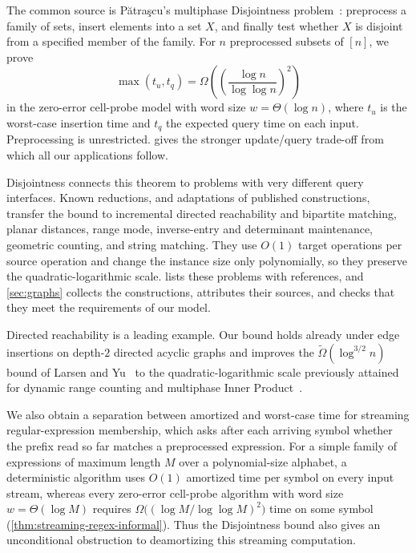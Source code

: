 \documentclass[11pt]{article}
\theoremstyle{plain}
\theoremstyle{definition}
\theoremstyle{remark}
\newcommand{\Patrascu}{P\u{a}tra\c{s}cu\xspace}
\begin{document}
The common source is \Patrascu's multiphase Disjointness problem~\cite{patrascu_mihai_towards_2010}: preprocess a family of sets, insert elements into a set $X$, and finally test whether $X$ is disjoint from a specified member of the family. For $n$ preprocessed subsets of $[n]$, we prove
\[
\max(t_u,t_q)=\Omega\!\left(\left(\frac{\log n}{\log\log n}\right)^2\right)
\]
in the zero-error cell-probe model with word size $w=\Theta(\log n)$, where $t_u$ is the worst-case insertion time and $t_q$ the expected query time on each input. Preprocessing is unrestricted.  gives the stronger update/query trade-off from which all our applications follow.

Disjointness connects this theorem to problems with very different query interfaces. Known reductions, and adaptations of published constructions, transfer the bound to incremental directed reachability and bipartite matching, planar distances, range mode, inverse-entry and determinant maintenance, geometric counting, and string matching. They use $O(1)$ target operations per source operation and change the instance size only polynomially, so they preserve the quadratic-logarithmic scale.  lists these problems with references, and \cref{sec:graphs} collects the constructions, attributes their sources, and checks that they meet the requirements of our model.

Directed reachability is a leading example. Our bound holds already under edge insertions on depth-$2$ directed acyclic graphs and improves the $\widetilde\Omega(\log^{3/2}n)$ bound of Larsen and Yu~\cite{larsen_super-logarithmic_2025} to the quadratic-logarithmic scale previously attained for dynamic range counting and multiphase Inner Product~\cite{larsen_cell_2012,ko_omega_2026}.

We also obtain a separation between amortized and worst-case time for streaming regular-expression membership, which asks after each arriving symbol whether the prefix read so far matches a preprocessed expression. For a simple family of expressions of maximum length $M$ over a polynomial-size alphabet, a deterministic algorithm uses $O(1)$ amortized time per symbol on every input stream, whereas every zero-error cell-probe algorithm with word size $w=\Theta(\log M)$ requires $\Omega\big((\log M/\log\log M)^2\big)$ time on some symbol (\cref{thm:streaming-regex-informal}). Thus the Disjointness bound also gives an unconditional obstruction to deamortizing this streaming computation.
\end{document}
